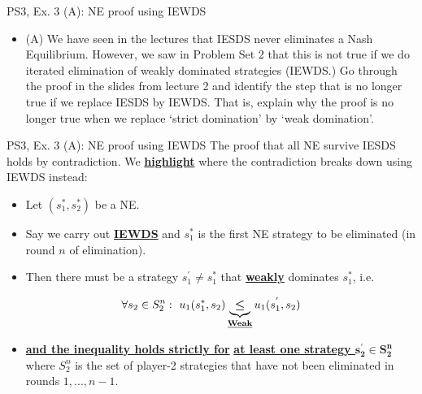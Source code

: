 \begin{frame}{PS3, Ex. 3 (A): NE proof using IEWDS}
  \begin{itemize}
    \item[3.] (A)  We have seen in the lectures that IESDS never eliminates a Nash Equilibrium. However, we saw in Problem Set 2 that this is not true if we do iterated elimination of weakly dominated strategies (IEWDS.) Go through the proof in the slides from lecture 2 and identify the step that is no longer true if we replace IESDS by IEWDS. That is, explain why the proof is no longer true when we replace ‘strict domination’ by ‘weak domination’.
  \end{itemize}
  \begin{multicols}{2}
  \vfill\null \columnbreak
  \vfill\null
  \end{multicols}
\end{frame}
\begin{frame}{PS3, Ex. 3 (A): NE proof using IEWDS}
    The proof that all NE survive IESDS holds by contradiction. We \underline{\textbf{highlight}} where the contradiction breaks down using IEWDS instead:
  \begin{multicols}{2}
    \begin{itemize}
      \item Let $(s_1^{*},s_2^{*})$ be a NE.
      \item Say we carry out \underline{\textbf{IEWDS}} and $s_1^{*}$ is the first NE strategy to be eliminated (in round $n$ of elimination).
      \item Then there must be a strategy $s_1^{'}\neq s_1^{*}$ that \underline{\textbf{weakly}} dominates $s_1^{*}$, i.e.
    \end{itemize}
      \begin{align*}
        \forall s_2\in S_2^n:\ u_1(s_1^{*},s_2)\underbrace{\bm{\leq}}_\text{\underline{\textbf{Weak}}}u_1(s_1^{'},s_2)
      \end{align*}
      \begin{itemize}
        \item[] \underline{\textbf{and the inequality holds strictly for}} \underline{\textbf{at least one strategy $\bm{s_2^{'}\in S_2^n}$}} where $S_2^n$ is the set of player-2 strategies that have not been eliminated in rounds $1,...,n-1$.
      \end{itemize}
  \vfill\null \columnbreak
  \vfill\null
  \end{multicols}
\end{frame}
